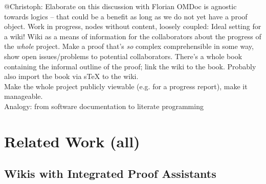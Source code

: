 \documentclass{llncs}
\begin{document}


\begin{todo}{@Christoph: Elaborate on this discussion with Florian}
  OMDoc is agnostic towards logics -- that could be a benefit as long as we do not yet
  have a proof object. Work in progress, nodes without content, loosely coupled: Ideal
  setting for a wiki!  Wiki as a means of information for the collaborators about the
  progress of the \emph{whole} project.  Make a proof that's \emph{so} complex
  comprehensible in some way, show open issues/problems to potential collaborators.
  There's a whole book containing the informal outline of the proof; link the wiki to the
  book.  Probably also import the book via sTeX to the wiki.\\
  Make the whole project publicly viewable (e.g. for a progress report), make it
  manageable.\\
  Analogy: from software documentation to literate programming
\end{todo}



\section{Related Work (all)}
\label{sec:related}


\subsection{Wikis with Integrated Proof Assistants}
\label{sec:wiki-pa}
\end{document}
